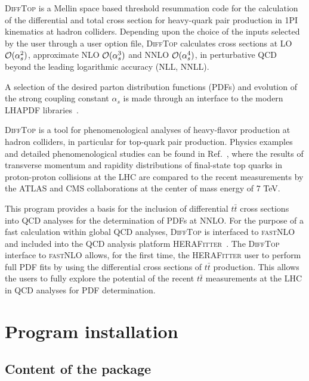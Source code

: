 \documentclass[11pt]{article}
\begin{document}
{\textsc{DiffTop} is a Mellin space based threshold resummation code for the calculation of the 
differential and total cross section for heavy-quark pair production 
in 1PI kinematics at hadron colliders.
Depending upon the choice of the inputs selected by the user through a user option file, 
\textsc{DiffTop} calculates cross sections
at LO ${\cal O}(\alpha_s^2)$, approximate NLO ${\cal O}(\alpha_s^3)$ and NNLO ${\cal O}(\alpha_s^4)$,
in perturbative QCD beyond the leading logarithmic accuracy (NLL, NNLL).

A selection of the desired parton distribution functions (PDFs) and evolution 
of the strong coupling constant $\alpha_s$ is made through an interface to 
the modern LHAPDF libraries~\cite{Butterworth:2014efa,lhapdf_web}.

\textsc{DiffTop} is a tool for phenomenological analyses of heavy-flavor production at hadron colliders, 
in particular for top-quark pair production. 
Physics examples and detailed phenomenological studies can be found in Ref.~\cite{Guzzi:2014wia},
where the results of transverse momentum and rapidity distributions 
of final-state top quarks in proton-proton collisions at the LHC are compared 
to the recent measurements by the ATLAS and CMS collaborations 
at the center of mass energy of 7 TeV.  

This program provides a basis for the inclusion of differential 
$t\bar{t}$ cross sections into QCD analyses for the determination of PDFs at NNLO. 
For the purpose of a fast calculation within global QCD analyses, 
\textsc{DiffTop} is interfaced to \textsc{fastNLO}~\cite{dis2014Fast,Britzger:2012bs,Wobisch:2011ij,Kluge:2006xs} 
and included into the QCD analysis platform \textsc{HERAFitter}~\cite{herafitter}. 
The \textsc{DiffTop} interface to \textsc{fastNLO} allows, for the first time, the \textsc{HERAFitter} user 
to perform full PDF fits by using the differential cross sections 
of $t\bar{t}$ production. This allows the users to fully explore the potential 
of the recent $t\bar{t}$ measurements at the LHC in QCD analyses for PDF determination.







\section{Program installation}\label{sec:Program installation}

\subsection{Content of the package}\label{sec:Content of the package}

}
\end{document}
